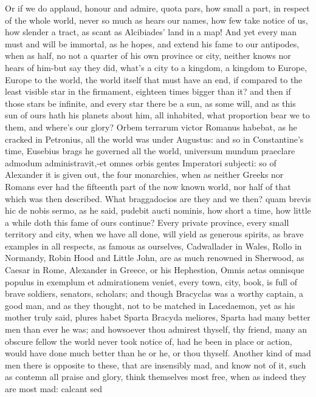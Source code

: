 {Or if we do applaud, honour and admire, quota pars, how small a part,
in respect of the whole world, never so much as hears our names, how
few take notice of us, how slender a tract, as scant as Alcibiades'
land in a map! And yet every man must and will be immortal, as he
hopes, and extend his fame to our antipodes, when as half, no not a
quarter of his own province or city, neither knows nor hears of him-but
say they did, what's a city to a kingdom, a kingdom to Europe, Europe
to the world, the world itself that must have an end, if compared to
the least visible star in the firmament, eighteen times bigger than it?
and then if those stars be infinite, and every star there be a sun, as
some will, and as this sun of ours hath his planets about him, all
inhabited, what proportion bear we to them, and where's our glory?
Orbem terrarum victor Romanus habebat, as he cracked in Petronius, all
the world was under Augustus: and so in Constantine's time, Eusebius
brags he governed all the world, universum mundum praeclare admodum
administravit,-et omnes orbis gentes Imperatori subjecti: so of
Alexander it is given out, the four monarchies, \etc{} when as neither
Greeks nor Romans ever had the fifteenth part of the now known world,
nor half of that which was then described. What braggadocios are they
and we then? quam brevis hic de nobis sermo, as he said,
pudebit aucti nominis, how short a time, how little a while doth
this fame of ours continue? Every private province, every small
territory and city, when we have all done, will yield as generous
spirits, as brave examples in all respects, as famous as ourselves,
Cadwallader in Wales, Rollo in Normandy, Robin Hood and Little John,
are as much renowned in Sherwood, as Caesar in Rome, Alexander in
Greece, or his Hephestion,  Omnis aetas omnisque populus in
exemplum et admirationem veniet, every town, city, book, is full of
brave soldiers, senators, scholars; and though Bracyclas was a
worthy captain, a good man, and as they thought, not to be matched in
Lacedaemon, yet as his mother truly said, plures habet Sparta Bracyda
meliores, Sparta had many better men than ever he was; and howsoever
thou admirest thyself, thy friend, many an obscure fellow the world
never took notice of, had he been in place or action, would have done
much better than he or he, or thou thyself.
Another kind of mad men there is opposite to these, that are insensibly
mad, and know not of it, such as contemn all praise and glory, think
themselves most free, when as indeed they are most mad: calcant sed
}
